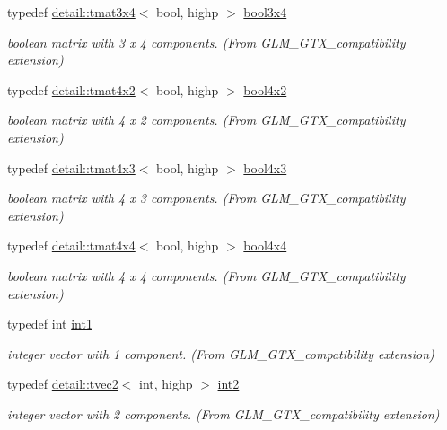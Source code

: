 \begin{DoxyCompactItemize}
typedef \hyperlink{structglm_1_1detail_1_1tmat3x4}{detail\+::tmat3x4}$<$ bool, highp $>$ \hyperlink{group__gtx__compatibility_gaf68d62e1c790fa3f09ef5e866af690f1}{bool3x4}
\begin{DoxyCompactList}\small\item\em boolean matrix with 3 x 4 components. (From G\+L\+M\+\_\+\+G\+T\+X\+\_\+compatibility extension) \end{DoxyCompactList}\item 
typedef \hyperlink{structglm_1_1detail_1_1tmat4x2}{detail\+::tmat4x2}$<$ bool, highp $>$ \hyperlink{group__gtx__compatibility_gaa431c2e87e8d78c4780c938a9483d6ff}{bool4x2}
\begin{DoxyCompactList}\small\item\em boolean matrix with 4 x 2 components. (From G\+L\+M\+\_\+\+G\+T\+X\+\_\+compatibility extension) \end{DoxyCompactList}\item 
typedef \hyperlink{structglm_1_1detail_1_1tmat4x3}{detail\+::tmat4x3}$<$ bool, highp $>$ \hyperlink{group__gtx__compatibility_ga7acb207ab877c53dc5751752e1f70053}{bool4x3}
\begin{DoxyCompactList}\small\item\em boolean matrix with 4 x 3 components. (From G\+L\+M\+\_\+\+G\+T\+X\+\_\+compatibility extension) \end{DoxyCompactList}\item 
typedef \hyperlink{structglm_1_1detail_1_1tmat4x4}{detail\+::tmat4x4}$<$ bool, highp $>$ \hyperlink{group__gtx__compatibility_ga4738dad3625bfa64ddf218897da020e9}{bool4x4}
\begin{DoxyCompactList}\small\item\em boolean matrix with 4 x 4 components. (From G\+L\+M\+\_\+\+G\+T\+X\+\_\+compatibility extension) \end{DoxyCompactList}\item 
typedef int \hyperlink{group__gtx__compatibility_gaba41d7803e4b24c17656d74377b88286}{int1}
\begin{DoxyCompactList}\small\item\em integer vector with 1 component. (From G\+L\+M\+\_\+\+G\+T\+X\+\_\+compatibility extension) \end{DoxyCompactList}\item 
typedef \hyperlink{structglm_1_1detail_1_1tvec2}{detail\+::tvec2}$<$ int, highp $>$ \hyperlink{group__gtx__compatibility_ga3f999377257cbda84c745b688ddcba81}{int2}
\begin{DoxyCompactList}\small\item\em integer vector with 2 components. (From G\+L\+M\+\_\+\+G\+T\+X\+\_\+compatibility extension) \end{DoxyCompactList}\item 

\end{DoxyCompactItemize}
